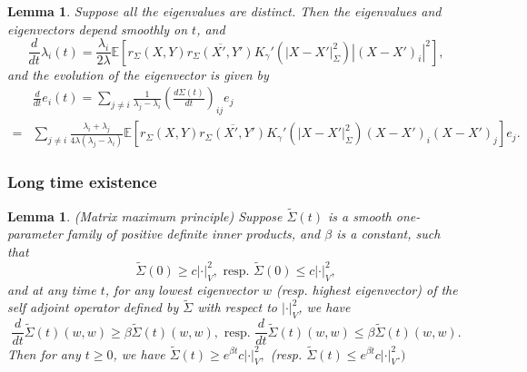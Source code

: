 \documentclass[a4paper]{article}
\newtheorem{lem}[thm]{Lemma}
\theoremstyle{definition}
\newcommand{\E}{\mathbb{E}}
\newcommand{\1}{\mathbbm{1}}
\begin{document}
	\begin{lem}\label{lem:eigenvalueevolution}
		Suppose all the eigenvalues are distinct. Then the eigenvalues and eigenvectors depend smoothly on $t$, and
		\[
		\frac{d}{dt} \lambda_i(t)= \frac{\lambda_i}{2\lambda}   \E[  r_\Sigma(X,Y)  \overline{r_\Sigma(X',Y') }    K_{\gamma}'( |X-X'|_\Sigma^2) |(X-X')_i|^2],
		\]
		and the evolution of the eigenvector is given by
		\[
		\begin{split}
			&  \frac{d}{dt} e_i(t)= \sum_{j\neq i} \frac{ 1 }{\lambda_j-\lambda_i  } (\frac{d \Sigma(t)}{dt})_{ij} e_j
			\\
			= & \sum_{j\neq i} \frac{\lambda_i+\lambda_j}{4\lambda(\lambda_j-\lambda_i)}   \E[  r_\Sigma(X,Y)  \overline{r_\Sigma(X',Y')  }   K_{\gamma}'( |X-X'|_\Sigma^2) (X-X')_i(X-X')_j] e_j.
		\end{split}
		\]
		
		
		
	\end{lem}
	
	
	
	
	
	
	
	
	
	
	
	
	
	
	
	
	\subsubsection{Long time existence}
	
	
	
	
	
	
	
	
	\begin{lem}
		(Matrix maximum principle)
		Suppose $\tilde{\Sigma}(t)$ is a smooth one-parameter family of positive definite inner products, and $\beta$ is a constant, such that
		\[
		\tilde{\Sigma}(0) \geq c|\cdot|_V^2 , \text{ resp. } \tilde{\Sigma}(0) \leq c |\cdot|_V^2 ,
		\]
		and at any time $t$,  for any lowest eigenvector $w$ (resp. highest eigenvector) of the self adjoint operator defined by $\tilde{\Sigma}$ with respect to $|\cdot|_V^2$, we have
		\[
		\frac{d}{dt} \tilde{\Sigma}(t)(w, w) \geq \beta  \tilde{\Sigma}(t) (w, w), \text{ resp. } \frac{d}{dt} \tilde{\Sigma}(t) (w, w) \leq \beta  \tilde{\Sigma}(t)  (w,w).
		\]
		Then for any $t\geq 0$, we have
		$
		\tilde{\Sigma} (t) \geq e^{\beta t} c|\cdot|_V^2 ,
		$
		(resp. $
		\tilde{\Sigma} (t) \leq e^{\beta t}c|\cdot|_V^2  . )
		$
		
		
		
	\end{lem}
	
\end{document}

